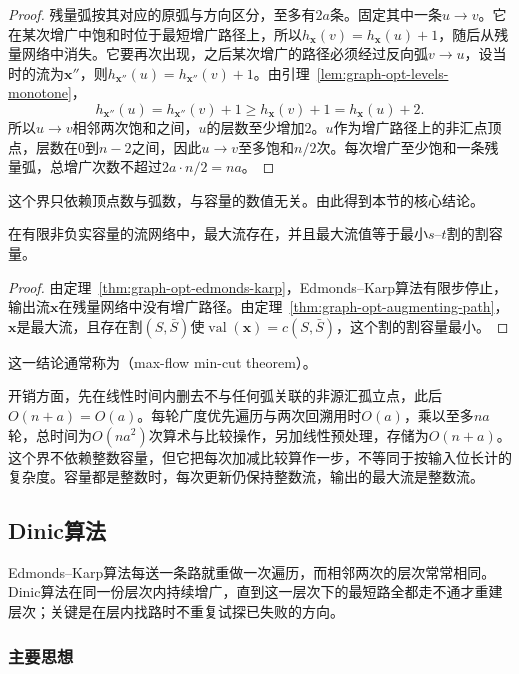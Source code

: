\begin{proof}
残量弧按其对应的原弧与方向区分，至多有$2a$条。固定其中一条$u\to v$。它在某次增广中饱和时位于最短增广路径上，所以$h_{\bm x}(v)=h_{\bm x}(u)+1$，随后从残量网络中消失。它要再次出现，之后某次增广的路径必须经过反向弧$v\to u$，设当时的流为$\bm x''$，则$h_{\bm x''}(u)=h_{\bm x''}(v)+1$。由引理~\ref{lem:graph-opt-levels-monotone}，
\[
  h_{\bm x''}(u)=h_{\bm x''}(v)+1\geq h_{\bm x}(v)+1=h_{\bm x}(u)+2.
\]
所以$u\to v$相邻两次饱和之间，$u$的层数至少增加$2$。$u$作为增广路径上的非汇点顶点，层数在$0$到$n-2$之间，因此$u\to v$至多饱和$n/2$次。每次增广至少饱和一条残量弧，总增广次数不超过$2a\cdot n/2=na$。
\end{proof}

这个界只依赖顶点数与弧数，与容量的数值无关。由此得到本节的核心结论。

\begin{theorem}[最大流最小割定理]
\label{thm:graph-opt-max-flow-min-cut}
在有限非负实容量的流网络中，最大流存在，并且最大流值等于最小$s$--$t$割的割容量。
\end{theorem}

\begin{proof}
由定理~\ref{thm:graph-opt-edmonds-karp}，Edmonds--Karp算法有限步停止，输出流$\bm x$在残量网络中没有增广路径。由定理~\ref{thm:graph-opt-augmenting-path}，$\bm x$是最大流，且存在割$(S,\bar S)$使$\operatorname{val}(\bm x)=c(S,\bar S)$，这个割的割容量最小。
\end{proof}

这一结论通常称为（max-flow min-cut theorem）。

开销方面，先在线性时间内删去不与任何弧关联的非源汇孤立点，此后$O(n+a)=O(a)$。每轮广度优先遍历与两次回溯用时$O(a)$，乘以至多$na$轮，总时间为$O(na^2)$次算术与比较操作，另加线性预处理，存储为$O(n+a)$。这个界不依赖整数容量，但它把每次加减比较算作一步，不等同于按输入位长计的复杂度。容量都是整数时，每次更新仍保持整数流，输出的最大流是整数流。

\subsection{Dinic算法}
\label{sec:graph-opt-dinic}

Edmonds--Karp算法每送一条路就重做一次遍历，而相邻两次的层次常常相同。Dinic算法在同一份层次内持续增广，直到这一层次下的最短路全都走不通才重建层次；关键是在层内找路时不重复试探已失败的方向。

\subsubsection{主要思想}


